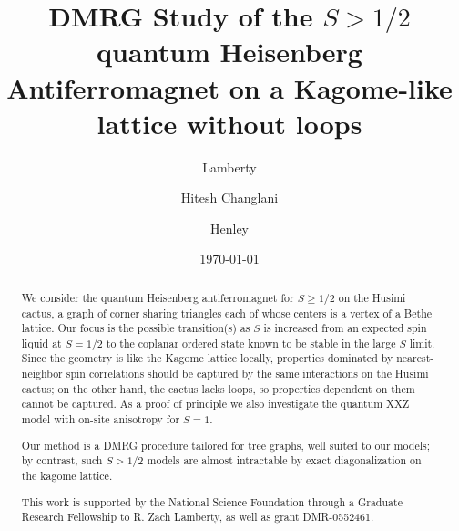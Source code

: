 \documentclass[aps]{revtex4-1}
\begin{document}
\title{DMRG Study of the $S>1/2$ quantum Heisenberg Antiferromagnet on a Kagome-like lattice without loops}
\date{\today}

\author{ Lamberty}
\author{Hitesh Changlani}
\author{ Henley}

\begin{abstract}
We consider the quantum Heisenberg antiferromagnet for $S\ge1/2$ on the Husimi cactus, a graph of corner sharing triangles each of whose centers is a vertex of a Bethe lattice. Our focus is the possible transition(s) as $S$ is increased from an expected spin liquid at $S=1/2$ to the coplanar ordered state known to be stable in the large $S$ limit. Since the geometry is like the Kagome lattice locally, properties dominated by nearest-neighbor spin correlations should be captured by the same interactions on the Husimi cactus; on the other hand, the cactus lacks loops, so properties dependent on them cannot be captured.  As a proof of principle we also investigate the quantum XXZ model with on-site anisotropy for $S=1$.

Our method is a DMRG procedure tailored for tree graphs, well suited to our models; by contrast, such $S>1/2$ models are almost intractable by exact diagonalization on the kagome lattice.

This work is supported by the National Science Foundation through a Graduate Research Fellowship to R. Zach Lamberty, as well as grant DMR-0552461.

\end{abstract}
\maketitle
\end{document}
